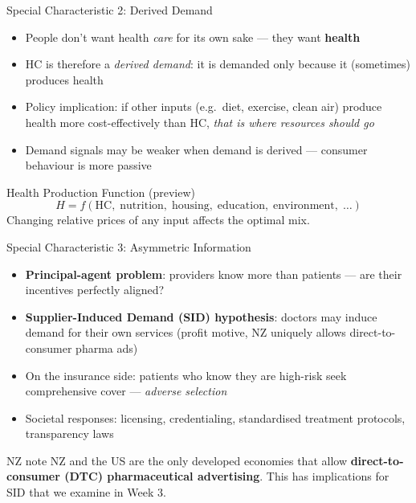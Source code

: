 \documentclass[aspectratio=169, 12pt]{beamer}
\begin{document}
\begin{frame}{Special Characteristic 2: Derived Demand}
  \begin{itemize}
    \item People don't want health \emph{care} for its own sake --- they want \textbf{health}
    \item HC is therefore a \textit{derived demand}: it is demanded only because it (sometimes)
          produces health
    \item Policy implication: if other inputs (e.g.\ diet, exercise, clean air) produce health
          more cost-effectively than HC, \emph{that is where resources should go}
    \item Demand signals may be weaker when demand is derived --- consumer behaviour is more
          passive
  \end{itemize}
  \vspace{0.3em}
  \begin{block}{Health Production Function (preview)}
    $$H = f(\text{HC},\; \text{nutrition},\; \text{housing},\; \text{education},\; \text{environment},\; \ldots)$$
    Changing relative prices of any input affects the optimal mix.
  \end{block}
\end{frame}

\begin{frame}{Special Characteristic 3: Asymmetric Information}
  \begin{itemize}
    \item \textbf{Principal-agent problem}: providers know more than patients ---
          are their incentives perfectly aligned?
    \item \textbf{Supplier-Induced Demand (SID) hypothesis}: doctors may induce demand for
          their own services (profit motive, NZ uniquely allows direct-to-consumer pharma ads)
    \item On the insurance side: patients who know they are high-risk seek comprehensive cover
          --- \textit{adverse selection}
    \item Societal responses: licensing, credentialing, standardised treatment protocols,
          transparency laws
  \end{itemize}
  \begin{exampleblock}{NZ note}
    NZ and the US are the only developed economies that allow \textbf{direct-to-consumer (DTC)
    pharmaceutical advertising}. This has implications for SID that we examine in Week 3.
  \end{exampleblock}
\end{frame}
\end{document}
